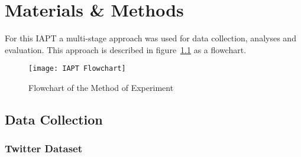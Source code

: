 \chapter{Materials \& Methods}


For this \ac{IAPT} a multi-stage approach was used for data collection, analyses and evaluation.
This approach is described in figure~\ref{fig:flowchart} as a flowchart.

\begin{figure}[h!]
\texttt{[image: IAPT Flowchart]}
\caption[Method Flowchart]{Flowchart of the Method of Experiment}
\label{fig:flowchart}
\end{figure}



\section{Data Collection}

\subsection{Twitter Dataset}

